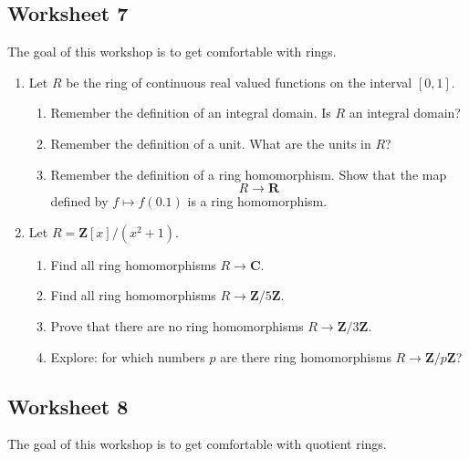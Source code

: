 \documentclass[11pt]{article}
\begin{document}
\subsection{Worksheet 7}
\label{sec:orgb9cf34e}
The goal of this workshop is to get comfortable with rings.

\begin{enumerate}
\item Let \(R\) be the ring of continuous real valued functions on the interval \([0,1]\).
\begin{enumerate}
\item Remember the definition of an integral domain.  Is \(R\) an integral domain?
\item Remember the definition of a unit.   What are the units in \(R\)?
\item Remember the definition of a ring homomorphism.  Show that the map
\[ R \to \mathbf{R}\]
defined by \(f \mapsto f(0.1)\) is a ring homomorphism.
\end{enumerate}

\item Let \(R = \mathbf{Z}[x]/(x^2 + 1)\).
\begin{enumerate}
\item Find all ring homomorphisms \(R \to \mathbf{C}\).
\item Find all ring homomorphisms \(R \to \mathbf{Z}/ 5 \mathbf{Z}\).
\item Prove that there are no ring homomorphisms \(R \to \mathbf{Z} / 3 \mathbf{Z}\).
\item Explore: for which numbers \(p\) are there ring homomorphisms \(R \to \mathbf{Z}/ p \mathbf{Z}\)?
\end{enumerate}
\end{enumerate}



\subsection{Worksheet 8}
\label{sec:orge923375}
The goal of this workshop is to get comfortable with quotient rings.
\end{document}
